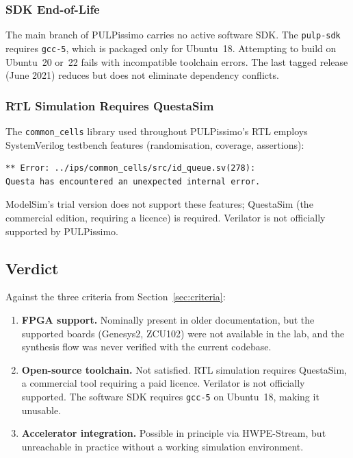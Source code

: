 \documentclass[journal]{IEEEtran}
\begin{document}
\subsubsection{SDK End-of-Life}

The main branch of PULPissimo carries no active software SDK. The
\texttt{pulp-sdk} requires \texttt{gcc-5}, which is packaged only for
Ubuntu~18. Attempting to build on Ubuntu~20 or~22 fails with
incompatible toolchain errors. The last tagged release (June 2021) reduces
but does not eliminate dependency conflicts.

\subsubsection{RTL Simulation Requires QuestaSim}

The \texttt{common\_cells} library used throughout PULPissimo's RTL employs
SystemVerilog testbench features (randomisation, coverage, assertions):

\begin{lstlisting}
** Error: ../ips/common_cells/src/id_queue.sv(278):
Questa has encountered an unexpected internal error.
\end{lstlisting}

ModelSim's trial version does not support these features; QuestaSim (the
commercial edition, requiring a licence) is required. Verilator is not
officially supported by PULPissimo.

\subsection{Verdict}

Against the three criteria from Section~\ref{sec:criteria}:

\begin{enumerate}
  \item \textbf{FPGA support.} Nominally present in older documentation, but
        the supported boards (Genesys2, ZCU102) were not available in the lab,
        and the synthesis flow was never verified with the current codebase.
  \item \textbf{Open-source toolchain.} Not satisfied. RTL simulation requires
        QuestaSim, a commercial tool requiring a paid licence. Verilator is not
        officially supported. The software SDK requires \texttt{gcc-5} on
        Ubuntu~18, making it unusable.
  \item \textbf{Accelerator integration.} Possible in principle via HWPE-Stream,
        but unreachable in practice without a working simulation environment.
\end{enumerate}
\end{document}
